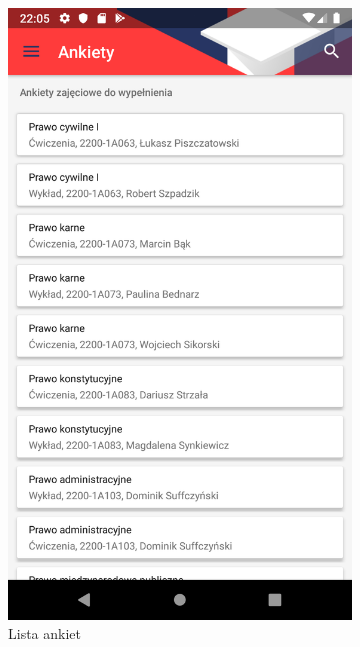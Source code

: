 \documentclass{pracamgr}
\begin{document}
\begin{figure}[p]
	\centering
	\begin{subfigure}[t]{0.3\textwidth}
		\includegraphics[width=\textwidth]{img/surveys_list.png}
		\caption{Lista ankiet}
		\label{fig:surveys_list}
	\end{subfigure}
	\quad
	\begin{subfigure}[t]{0.3\textwidth}

\end{subfigure}
\end{figure}
\end{document}
